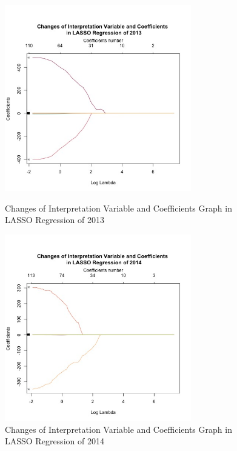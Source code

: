 \documentclass{mcmthesis}
\begin{document}
\begin{appendices}
\begin{figure}[H]
\centering
\begin{minipage}[t]{0.45\textwidth}
\centering
\includegraphics[width=3.2in]{figures/ChangesofInterpretationVariableandCoefficientsinLASSORegressionof2013.jpeg}
\caption{Changes of Interpretation Variable and Coefficients Graph in LASSO Regression of 2013}
\label{Changes of Interpretation Variable and Coefficients Graph in LASSO Regression of 2013}
\end{minipage}
\hfill
\begin{minipage}[t]{0.45\textwidth}
\centering
\includegraphics[width=3.2in]{figures/ChangesofInterpretationVariableandCoefficientsinLASSORegressionof2014.jpeg}
\caption{Changes of Interpretation Variable and Coefficients Graph in LASSO Regression of 2014}
\label{Changes of Interpretation Variable and Coefficients Graph in LASSO Regression of 2014}
\end{minipage}
\end{figure}


\end{appendices}
\end{document}
